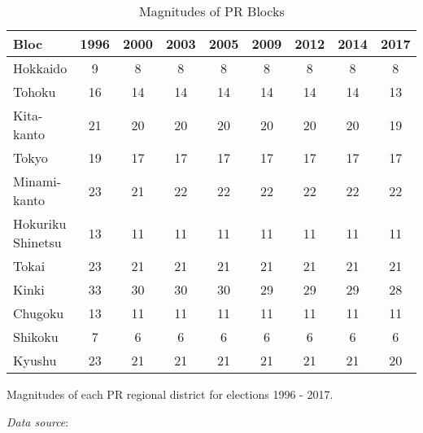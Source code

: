 \begin{table}[!htbp]
\begin{threeparttable}
\begin{tabular}{lcccccccc}
\toprule
Bloc & 1996 & 2000 & 2003 & 2005 & 2009 & 2012 & 2014 & 2017 \\
\midrule
Hokkaido & 9 & 8 & 8 & 8 & 8 & 8 & 8 & 8 \\
Tohoku & 16 & 14 & 14 & 14 & 14 & 14 & 14 & 13 \\
Kita-kanto & 21 & 20 & 20 & 20 & 20 & 20 & 20 & 19 \\
Tokyo & 19 & 17 & 17 & 17 & 17 & 17 & 17 & 17 \\
Minami-kanto & 23 & 21 & 22 & 22 & 22 & 22 & 22 & 22 \\
Hokuriku Shinetsu & 13 & 11 & 11 & 11 & 11 & 11 & 11 & 11 \\
Tokai & 23 & 21 & 21 & 21 & 21 & 21 & 21 & 21 \\
Kinki & 33 & 30 & 30 & 30 & 29 & 29 & 29 & 28 \\
Chugoku & 13 & 11 & 11 & 11 & 11 & 11 & 11 & 11 \\
Shikoku & 7 & 6 & 6 & 6 & 6 & 6 & 6 & 6 \\
Kyushu & 23 & 21 & 21 & 21 & 21 & 21 & 21 & 20 \\
\bottomrule
\end{tabular}
\begin{tablenotes}[flushleft]
  \scriptsize{
    \item Magnitudes of each PR regional district for elections 1996 - 2017. 
    \item \textit{Data source}: \citet{reedReedSmithJapaneseHouse2017, ministryofinternalaffairsandcommunicationsElectionSenkyo2024}
  }
\end{tablenotes}
\end{threeparttable}
\caption{Magnitudes of PR Blocks}
\label{tab:distM}
\end{table}
